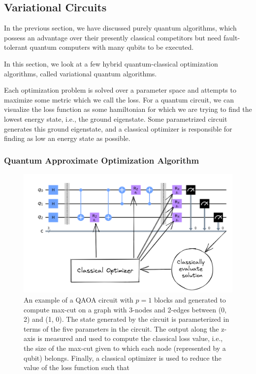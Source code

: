 \subsection{Variational Circuits}
\label{sec:variational-circuits}

In the previous section, we have discussed purely quantum algorithms, which possess an advantage over their presently classical competitors but need fault-tolerant quantum computers with many qubits to be executed.

In this section, we look at a few hybrid quantum-classical optimization algorithms, called variational quantum algorithms. 

Each optimization problem is solved over a parameter space and attempts to maximize some metric which we call the loss. For a quantum circuit, we can visualize the loss function as some hamiltonian for which we are trying to find the lowest energy state, i.e., the ground eigenstate. Some parametrized circuit generates this ground eigenstate, and a classical optimizer is responsible for finding as low an energy state as possible.

\subsubsection{Quantum Approximate Optimization Algorithm}
\label{sec:variational-circuits-qaoa}

\begin{figure}[ht]
    \centering
    \includegraphics[width=0.7\linewidth]{figures/intro/qaoa-optimization.png}
    \caption[Variational Circuit for QAOA]{An example of a QAOA circuit with $p = 1$ blocks and generated to compute max-cut on a graph with 3-nodes and 2-edges between (0, 2) and (1, 0). The state generated by the circuit is parameterized in terms of the five parameters in the circuit. The output along the z-axis is measured and used to compute the classical loss value, i.e., the size of the max-cut given to which each node (represented by a qubit) belongs. Finally, a classical optimizer is used to reduce the value of the loss function such that }
\end{figure}

